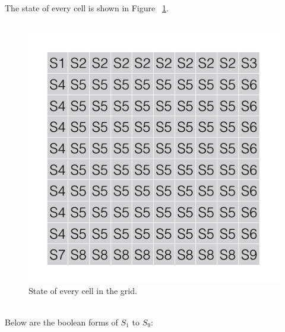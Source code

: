 \documentclass[paper=a4, fontsize=11pt]{scrartcl} %
\numberwithin{equation}{section} %
\numberwithin{figure}{section} %
\numberwithin{table}{section} %
\begin{document}
The state of every cell is shown in Figure ~\ref{fig:Problem1.1.1}.\\
\\
\begin{figure}[h]
    \centering
    \includegraphics[scale=0.5]{image7.png}
    \caption{State of every cell in the grid.}
    \label{fig:Problem1.1.1}
\end{figure}\\

Below are the boolean forms of $S_1$ to $S_9$:
\end{document}
